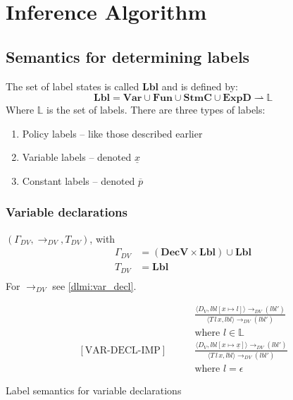 
\newcommand{\iVar}{\mathbf{Var}}
\newcommand{\iFun}{\mathbf{Fun}}
\newcommand{\iDecv}{\mathbf{DecV}}
\newcommand{\iDecf}{\mathbf{DecF}}
\newcommand{\iStmc}{\mathbf{StmC}}
\newcommand{\iExpd}{\mathbf{ExpD}}
\newcommand{\iLbl}{\mathbf{Lbl}}

\newcommand{\trtspc}{\hspace{2em}} %

\section{Inference Algorithm}

\subsection{Semantics for determining labels}
The set of label states is called $\iLbl$ and is defined by:
\[
  \iLbl = \iVar \cup \iFun \cup \iStmc \cup \iExpd \rightharpoonup \mathbb{L}
\]
Where $\mathbb{L}$ is the set of labels.
There are three types of labels:
\begin{enumerate}
  \item Policy labels -- like those described earlier
  \item Variable labels -- denoted $\underline{x}$
  \item Constant labels -- denoted $\overline{p}$
\end{enumerate}

\subsubsection{Variable declarations}
$(\Gamma_{DV}, \rightarrow_{DV}, T_{DV})$, with
\begin{align*}
  \Gamma_{DV} & = (\iDecv \times \iLbl) \cup \iLbl \\
  T_{DV} & = \iLbl \\
\end{align*}
For $\rightarrow_{DV}$ see \cref{dlmi:var_decl}.

\begin{table}
\begin{align*}
  [\text{VAR-DECL-EXP}] \trtspc & \frac{
    \langle D_V, lbl[x \mapsto l] \rangle \rightarrow_{DV} (lbl')
  }{
    \langle T \, l \, x, lbl \rangle \rightarrow_{DV} (lbl')
  }\\
  & \text{where } l \in \mathbb{L}\\[2em]
  [\text{VAR-DECL-IMP}] \trtspc & \frac{
    \langle D_V, lbl[x \mapsto \underline{x}] \rangle \rightarrow_{DV} (lbl')
  }{
    \langle T \, l \, x, lbl \rangle \rightarrow_{DV} (lbl')
  }\\
  & \text{where } l = \epsilon
\end{align*}
\caption{Label semantics for variable declarations}
\label{dlmi:var_decl}
\end{table}

